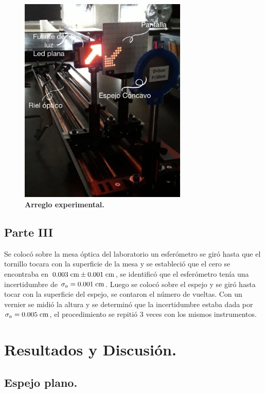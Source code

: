 \documentclass[DIV=calc, paper=a4, fontsize=11pt]{scrartcl}
\begin{document}
\begin{figure}[H]
    \centering
    \includegraphics[width=8cm]{fotos/D2FD62FA-C29E-4E97-AB6B-5FD1C6AE4100.jpeg}
    \caption{\textbf{Arreglo experimental.}}
    \label{fig:my_label}
\end{figure}
\subsection*{\textcolor{carmine}{Parte III}}
Se colocó sobre la mesa óptica del laboratorio un esferómetro  se giró hasta que el tornillo tocara con la superficie de la mesa y se estableció que el cero se encontraba en $0.003\hspace{0.1cm}\text{cm}\pm0.001\hspace{0.1cm}\text{cm}$, se identificó que el esferómetro tenía una incertidumbre de $\sigma_{a}=0.001\hspace{0.1cm}\text{cm}$. Luego se colocó sobre el espejo y se giró hasta tocar con la superficie del espejo, se contaron el número de vueltas. Con un vernier se midió la altura y se determinó que la incertidumbre estaba dada por $\sigma_{a}=0.005\hspace{0.1cm}\text{cm}$, el procedimiento se repitió 3 veces con los mismos instrumentos. 
\newpage
\section*{\textcolor{carmine}{Resultados y Discusión.}}

\subsection*{\textcolor{carmine}{Espejo plano.}}
\end{document}
